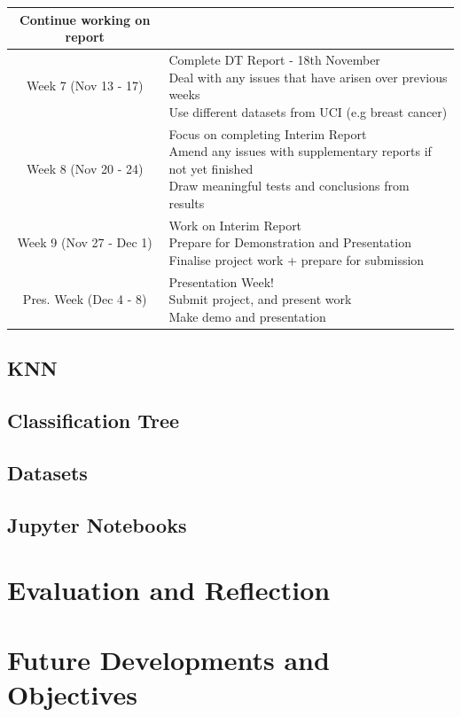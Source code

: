 \documentclass[letterpaper,10pt]{article}
\begin{document}
\begin{tabular}{|c|p{10cm}|}
{Continue working on report} \\
\hline
Week 7 (Nov 13 - 17) & 
\makecell[l]{Complete DT Report - 18th November \\
Deal with any issues that have arisen over previous weeks \\
Use different datasets from UCI (e.g breast cancer)} \\
\hline
Week 8 (Nov 20 - 24) & 
\makecell[l]{ Focus on completing Interim Report \\
Amend any issues with supplementary reports if not yet finished \\
Draw meaningful tests and conclusions from results } \\
\hline
Week 9 (Nov 27 - Dec 1) & 
\makecell[l]{Work on Interim Report \\
Prepare for Demonstration and Presentation \\
Finalise project work + prepare for submission} \\
\hline
Pres. Week (Dec 4 - 8) & 
\makecell[l]{Presentation Week!\\
Submit project, and present work \\
Make demo and presentation} \\
\hline
\end{tabular}
\subsection{KNN}

\subsection{Classification Tree}
\subsection{Datasets}
\subsection{Jupyter Notebooks}

\newpage
\section{Evaluation and Reflection}
\section{Future Developments and Objectives}
\newpage


\end{document}
